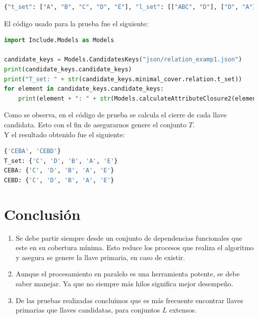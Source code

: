 \documentclass[a4paper,12pt]{article}
\begin{document}
{\begin{lstlisting}[language=python, caption={Archivo JSON de relación con varias llaves candidatas, agregando un atributo.\\\hspace{\textwidth}}, captionpos=t]
{"t_set": ["A", "B", "C", "D", "E"], "l_set": [["ABC", "D"], ["D", "A"]]}
\end{lstlisting}

El código usado para la prueba fue el siguiente:

\begin{lstlisting}[language=python, caption={Prueba con una relación con varias llaves candidatas.\\\hspace{\textwidth}}, captionpos=t]
import Include.Models as Models

candidate_keys = Models.CandidatesKeys("json/relation_examp1.json")
print(candidate_keys.candidate_keys)
print("T_set: " + str(candidate_keys.minimal_cover.relation.t_set))
for element in candidate_keys.candidate_keys:
    print(element + ": " + str(Models.calculateAttributeClosure2(element,candidate_keys.minimal_cover.irreducible_rel.l_set)))

\end{lstlisting}
Como se observa, en el código de prueba se calcula el cierre de cada llave candidata. Esto con el fin de asegurarnos genere el conjunto $T$.
\\
Y el resultado obtenido fue el siguiente:

\begin{lstlisting}[language=bash, caption={Resultado de llaves candidatas.\\\hspace{\textwidth}}, captionpos=t]
{'CEBA', 'CEBD'}
T_set: {'C', 'D', 'B', 'A', 'E'}
CEBA: {'C', 'D', 'B', 'A', 'E'}
CEBD: {'C', 'D', 'B', 'A', 'E'}
\end{lstlisting}



\newpage

\section{Conclusión}
\begin{enumerate}
\item Se debe partir siempre desde un conjunto de dependencias funcionales que este en su cobertura mínima. Esto reduce los procesos que realiza el algoritmo y asegura se genere la llave primaria, en caso de existir.
\item Aunque el procesamiento en paralelo es una herramienta potente, se debe saber manejar. Ya que no siempre más hilos significa mejor desempeño.
\item De las pruebas realizadas concluimos que es más frecuente encontrar llaves primarias que llaves candidatas, para conjuntos $L$ extensos.
\end{enumerate}


}
\end{document}
